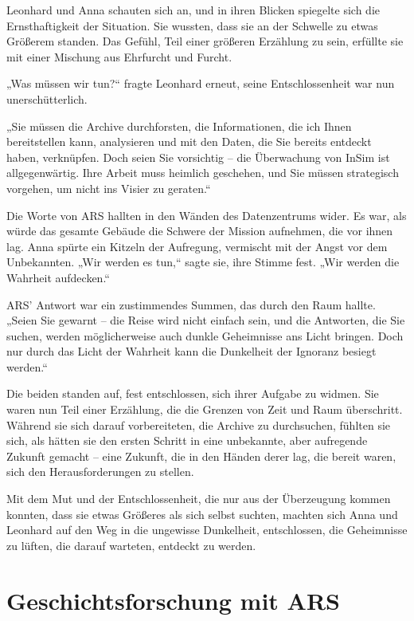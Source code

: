 \documentclass[
]{article}
\begin{document}
Leonhard und Anna schauten sich an, und in ihren Blicken spiegelte sich
die Ernsthaftigkeit der Situation. Sie wussten, dass sie an der Schwelle
zu etwas Größerem standen. Das Gefühl, Teil einer größeren Erzählung zu
sein, erfüllte sie mit einer Mischung aus Ehrfurcht und Furcht.

„Was müssen wir tun?{\kern0pt}`` fragte Leonhard erneut, seine
Entschlossenheit war nun unerschütterlich.

„Sie müssen die Archive durchforsten, die Informationen, die ich Ihnen
bereitstellen kann, analysieren und mit den Daten, die Sie bereits
entdeckt haben, verknüpfen. Doch seien Sie vorsichtig -- die Überwachung
von InSim ist allgegenwärtig. Ihre Arbeit muss heimlich geschehen, und
Sie müssen strategisch vorgehen, um nicht ins Visier zu geraten.``

Die Worte von ARS hallten in den Wänden des Datenzentrums wider. Es war,
als würde das gesamte Gebäude die Schwere der Mission aufnehmen, die vor
ihnen lag. Anna spürte ein Kitzeln der Aufregung, vermischt mit der
Angst vor dem Unbekannten. „Wir werden es tun,`` sagte sie, ihre Stimme
fest. „Wir werden die Wahrheit aufdecken.``

ARS' Antwort war ein zustimmendes Summen, das durch den Raum hallte.
„Seien Sie gewarnt -- die Reise wird nicht einfach sein, und die
Antworten, die Sie suchen, werden möglicherweise auch dunkle Geheimnisse
ans Licht bringen. Doch nur durch das Licht der Wahrheit kann die
Dunkelheit der Ignoranz besiegt werden.``

Die beiden standen auf, fest entschlossen, sich ihrer Aufgabe zu widmen.
Sie waren nun Teil einer Erzählung, die die Grenzen von Zeit und Raum
überschritt. Während sie sich darauf vorbereiteten, die Archive zu
durchsuchen, fühlten sie sich, als hätten sie den ersten Schritt in eine
unbekannte, aber aufregende Zukunft gemacht -- eine Zukunft, die in den
Händen derer lag, die bereit waren, sich den Herausforderungen zu
stellen.

Mit dem Mut und der Entschlossenheit, die nur aus der Überzeugung kommen
konnten, dass sie etwas Größeres als sich selbst suchten, machten sich
Anna und Leonhard auf den Weg in die ungewisse Dunkelheit, entschlossen,
die Geheimnisse zu lüften, die darauf warteten, entdeckt zu werden.

\section{Geschichtsforschung mit ARS}\label{geschichtsforschung-mit-ars}
\end{document}
